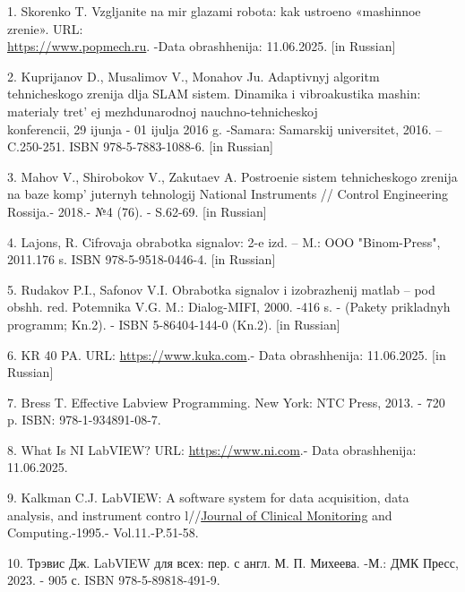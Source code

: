\begin{references}
1. Skorenko T. Vzgljanite na mir glazami robota: kak ustroeno «mashinnoe
zrenie». URL:\\
\href{https://www.popmech.ru/technologies/238704-glazami-robota-chtotakoe-mashinnoe-zrenie/}{https://www.popmech.ru}. -Data obrashhenija: 11.06.2025. {[}in Russian{]}

2. Kuprijanov D., Musalimov V., Monahov Ju. Adaptivnyj algoritm
tehnicheskogo zrenija dlja SLAM sistem. Dinamika i vibroakustika mashin:
materialy tret' ej mezhdunarodnoj nauchno-tehnicheskoj\\
konferencii, 29 ijunja - 01 ijulja 2016 g. -Samara: Samarskij
universitet, 2016. -- C.250-251. ISBN 978-5-7883-1088-6. {[}in
Russian{]}

3. Mahov V., Shirobokov V., Zakutaev A. Postroenie sistem tehnicheskogo
zrenija na baze komp' juternyh tehnologij National
Instruments // Control Engineering Rossija.- 2018.- №4 (76). - S.62-69.
{[}in Russian{]}

4. Lajons, R. Cifrovaja obrabotka signalov: 2-e izd. -- M.: OOO
"Binom-Press", 2011.176 s. ISBN 978-5-9518-0446-4. {[}in Russian{]}

5. Rudakov P.I., Safonov V.I. Obrabotka signalov i izobrazhenij matlab
-- pod obshh. red. Potemnika V.G. M.: Dialog-MIFI, 2000. -416 s. -
(Pakety prikladnyh programm; Kn.2). - ISBN 5-86404-144-0 (Kn.2). {[}in
Russian{]}

6. KR 40 PA.
URL: \href{https://www.kuka.com/en-de/products/robot-systems/industrial-robots/kr-40-pa.html}{https://www.kuka.com}.-
Data obrashhenija: 11.06.2025. {[}in Russian{]}

7. Bress T. Effective Labview Programming. New York: NTC Press, 2013. -
720 p. ISBN: 978-1-934891-08-7.

8. What Is NI LabVIEW? URL: \href{https://www.ni.com/ru-ru/shop/labview.html}{https://www.ni.com}.-
Data obrashhenija: 11.06.2025.

9. Kalkman C.J. LabVIEW: A software system for data acquisition, data
analysis, and instrument contro
l//\href{https://link.springer.com/journal/10877}{Journal of Clinical
Monitoring} and Computing.-1995.- Vol.11.-P.51-58.

10. Трэвис Дж. LabVIEW для всех: пер. с англ. М. П. Михеева. -М.: ДМК
Пресс, 2023. - 905 с. ISBN 978-5-89818-491-9.
\end{references}

